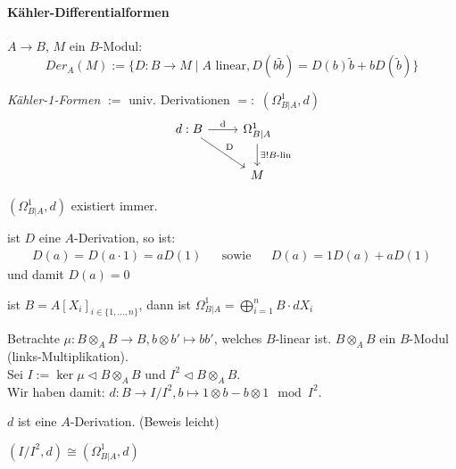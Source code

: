 \paragraph{Kähler-Differentialformen}
$A\rightarrow B$, $M$ ein $B$-Modul:
\[
Der_A(M):=\{
D:B\rightarrow M\mid A\text{ linear}, D(b\tilde b)=D(b)\tilde b + bD(\tilde b)
\}
\]
\begin{defn}
\emph{Kähler-1-Formen} $:=$ univ. Derivationen $=:$ $(\Omega_{B|A}^1,d)$
	\[\begin{tikzcd}
		d:B \rar{\text{d}} \arrow{dr}{\text{D}} & \Omega_{B\mid A}^1
    \dar{\exists! \text{$B$-lin}} \\
		                                                 & M
	\end{tikzcd}\]
\end{defn}
\begin{thm}
$(\Omega_{B|A}^1,d)$ existiert immer.
\end{thm}
\begin{bem}
ist $D$ eine $A$-Derivation, so ist:
\begin{align*}
D(a)=D(a\cdot 1)=a D(1) && \text{sowie} && D(a)=1D(a)+aD(1)
\end{align*}
und damit $D(a)=0$
\end{bem}
\begin{lem}
ist $B=A[X_i]_{i\in\{1,\dots,n\}}$, dann ist
$\Omega_{B|A}^1=\bigoplus_{i=1}^nB\cdot dX_i$
\end{lem}
Betrachte $\mu:B\otimes_A B\rightarrow B,b\otimes b'\mapsto bb'$, welches
$B$-linear ist. $B\otimes_A B$ ein $B$-Modul (links-Multiplikation).\\
Sei $I:=\ker\mu\vartriangleleft B\otimes_A B$ und $I^2\vartriangleleft
B\otimes_A B$.\\
Wir haben damit: $d:B\rightarrow I/I^2,b\mapsto 1\otimes b-b\otimes 1\mod I^2$.
\begin{bem}
$d$ ist eine $A$-Derivation. (Beweis leicht)
\end{bem}
\begin{thm}
$(I/I^2,d)\cong(\Omega_{B|A}^1,d)$
\end{thm}
